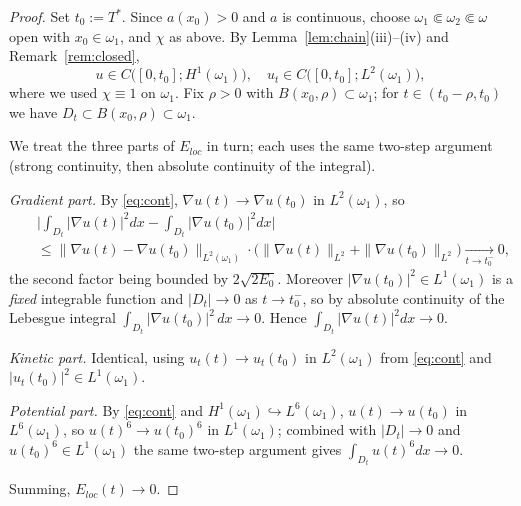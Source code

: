 \documentclass[11pt,letterpaper]{amsart}
\begin{document}
\begin{proof}
Set $t_0:=T^*$. Since $a(x_0)>0$ and $a$ is continuous, choose $\omega_1\Subset\omega_2\Subset\omega$
open with $x_0\in\omega_1$, and $\chi$ as above. By Lemma~\ref{lem:chain}(iii)--(iv) and
Remark~\ref{rem:closed},
\begin{equation}\label{eq:cont}
u\in C\big([0,t_0];H^1(\omega_1)\big),\quad u_t\in C\big([0,t_0];L^2(\omega_1)\big),
\end{equation}
where we used $\chi\equiv1$ on $\omega_1$. Fix $\rho>0$ with $B(x_0,\rho)\subset\omega_1$; for
$t\in(t_0-\rho,t_0)$ we have $D_t\subset B(x_0,\rho)\subset\omega_1$.

We treat the three parts of $E_{loc}$ in turn; each uses the same two-step argument (strong
continuity, then absolute continuity of the integral).

\emph{Gradient part.} By \eqref{eq:cont}, $\nabla u(t)\to\nabla u(t_0)$ in $L^2(\omega_1)$, so
\begin{eqnarray*}
&&\Big|\int_{D_t}|\nabla u(t)|^2dx-\int_{D_t}|\nabla u(t_0)|^2dx\Big|\\
&&\le \big\|\nabla u(t)-\nabla u(t_0)\big\|_{L^2(\omega_1)}\cdot\big(\|\nabla u(t)\|_{L^2}+\|\nabla u(t_0)\|_{L^2}\big)
\xrightarrow[t\to t_0^-]{}0,
\end{eqnarray*}
the second factor being bounded by $2\sqrt{2E_0}$. Moreover $|\nabla u(t_0)|^2\in L^1(\omega_1)$
is a \emph{fixed} integrable function and $|D_t|\to0$ as $t\to t_0^-$, so by absolute continuity
of the Lebesgue integral $\int_{D_t}|\nabla u(t_0)|^2\,dx\to0$. Hence
$\int_{D_t}|\nabla u(t)|^2dx\to0$.

\emph{Kinetic part.} Identical, using $u_t(t)\to u_t(t_0)$ in $L^2(\omega_1)$ from
\eqref{eq:cont} and $|u_t(t_0)|^2\in L^1(\omega_1)$.

\emph{Potential part.} By \eqref{eq:cont} and $H^1(\omega_1)\hookrightarrow L^6(\omega_1)$,
$u(t)\to u(t_0)$ in $L^6(\omega_1)$, so $u(t)^6\to u(t_0)^6$ in $L^1(\omega_1)$; combined with
$|D_t|\to0$ and $u(t_0)^6\in L^1(\omega_1)$ the same two-step argument gives
$\int_{D_t}u(t)^6dx\to0$.

Summing, $E_{loc}(t)\to0$.
\end{proof}
\end{document}
